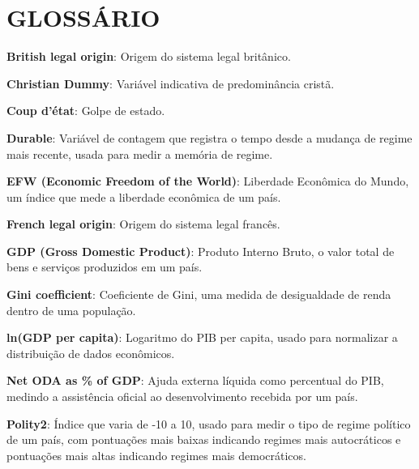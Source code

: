 






\chapter*{GLOSSÁRIO}

{ \setlength{\parindent}{0pt} %

\textbf{British legal origin}: Origem do sistema legal britânico.

\textbf{Christian Dummy}: Variável indicativa de predominância cristã.

\textbf{Coup d'état}: Golpe de estado. 

\textbf{Durable}: Variável de contagem que registra o tempo desde a mudança de regime mais recente, usada para medir a memória de regime.

\textbf{EFW (Economic Freedom of the World)}: Liberdade Econômica do Mundo, um índice que mede a liberdade econômica de um país.

\textbf{French legal origin}: Origem do sistema legal francês.

\textbf{GDP (Gross Domestic Product)}: Produto Interno Bruto, o valor total de bens e serviços produzidos em um país.

\textbf{Gini coefficient}: Coeficiente de Gini, uma medida de desigualdade de renda dentro de uma população.

\textbf{ln(GDP per capita)}: Logaritmo do PIB per capita, usado para normalizar a distribuição de dados econômicos.

\textbf{Net ODA as \% of GDP}: Ajuda externa líquida como percentual do PIB, medindo a assistência oficial ao desenvolvimento recebida por um país.

\textbf{Polity2}: Índice que varia de -10 a 10, usado para medir o tipo de regime político de um país, com pontuações mais baixas indicando regimes mais autocráticos e pontuações mais altas indicando regimes mais democráticos.

}
